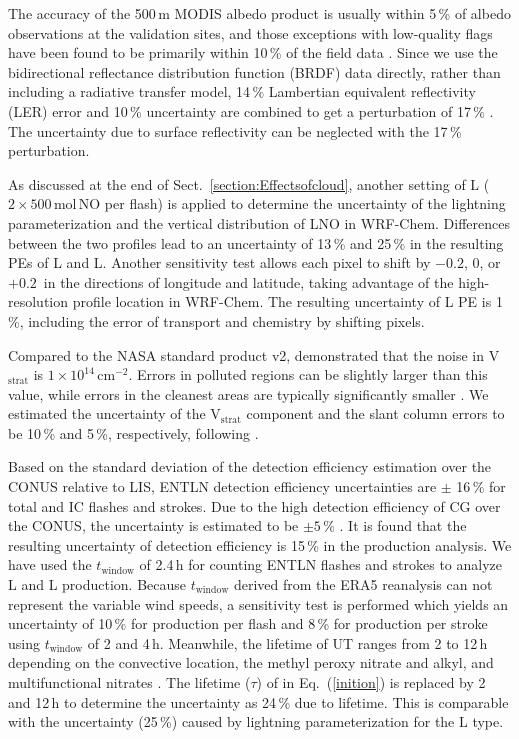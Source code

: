\documentclass[amt]{copernicus}
\begin{document}
The accuracy of the 500\,m MODIS albedo product is usually within 5\,{\%} of albedo observations at the validation sites, and those exceptions with low-quality flags have been found to be primarily within 10\,{\%} of the field data \citep{Schaaf.2011}.
Since we use the bidirectional reflectance distribution function (BRDF) data directly, rather than including a radiative transfer model, 14\,{\%} Lambertian equivalent reflectivity (LER) error and 10\,{\%} uncertainty are combined to get a perturbation of 17\,{\%} \citep{Laughner.2019}.
The uncertainty due to surface reflectivity can be neglected with the 17\,{\%} perturbation.

As discussed at the end of Sect.~\ref{section:Effectsofcloud}, another setting of L ($2\times500$\,mol\,NO per flash) is applied to determine the uncertainty of the lightning parameterization and the vertical distribution of LNO in WRF-Chem.
Differences between the two profiles lead to an uncertainty of 13\,{\%} and 25\,{\%} in the resulting PEs of L and L.
Another sensitivity test allows each pixel to shift by $-0.2$, 0, or $+0.2$\,{\degree} in the directions of longitude and latitude, taking advantage of the high-resolution profile location in WRF-Chem.
The resulting uncertainty of L PE is 1\,{\%}, including the error of transport and chemistry by shifting pixels.

Compared to the NASA standard product v2, \citet{Krotkov.2017} demonstrated that the noise in V$_\mathrm{strat}$ is $1 \times 10^{14}$\,cm$^{-2}$.
Errors in polluted regions can be slightly larger than this value, while errors in the cleanest areas are typically significantly smaller \citep{Bucsela.2013}.
We estimated the uncertainty of the V$_\mathrm{strat}$ component and the slant column errors to be 10\,{\%} and 5\,{\%}, respectively, following \citet{Allen.2019}.

Based on the standard deviation of the detection efficiency estimation over the CONUS relative to LIS, ENTLN detection efficiency uncertainties are $\pm$ 16\,{\%} for total and IC flashes and strokes.
Due to the high detection efficiency of CG over the CONUS, the uncertainty is estimated to be $\pm 5$\,{\%} \citep{Lapierre.2020}.
It is found that the resulting uncertainty of detection efficiency is 15\,{\%} in the production analysis.
We have used the $t_\mathrm{window}$ of 2.4\,h for counting ENTLN flashes and strokes to analyze L and L production.
Because $t_\mathrm{window}$ derived from the ERA5 reanalysis can not represent the variable wind speeds, a sensitivity test is performed which yields an uncertainty of 10\,{\%} for production per flash and 8\,{\%} for production per stroke using $t_\mathrm{window}$ of 2 and 4\,h.
Meanwhile, the lifetime of UT  ranges from 2 to 12\,h depending on the convective location, the methyl peroxy nitrate and alkyl, and multifunctional nitrates \citep{Nault.2017}.
The lifetime ($\tau$) of  in Eq.~(\ref{inition}) is replaced by 2 and 12\,h to determine the uncertainty as 24\,{\%} due to lifetime.
This is comparable with the uncertainty (25\,{\%}) caused by lightning parameterization for the L type.
\end{document}
